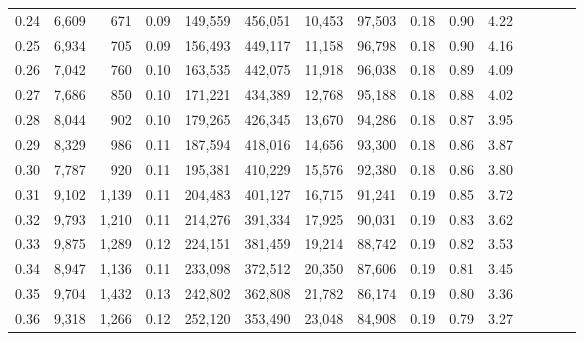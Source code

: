 \begin{tabular}{rrrcrrrrrrrrrrr}
0.24 &   6,609 &    671 &                                       0.09 &  149,559 &  456,051 &   10,453 &   97,503 &  0.18 &  0.90 &                         4.22 \\
0.25 &   6,934 &    705 &                                       0.09 &  156,493 &  449,117 &   11,158 &   96,798 &  0.18 &  0.90 &                         4.16 \\
0.26 &   7,042 &    760 &                                       0.10 &  163,535 &  442,075 &   11,918 &   96,038 &  0.18 &  0.89 &                         4.09 \\
0.27 &   7,686 &    850 &                                       0.10 &  171,221 &  434,389 &   12,768 &   95,188 &  0.18 &  0.88 &                         4.02 \\
0.28 &   8,044 &    902 &                                       0.10 &  179,265 &  426,345 &   13,670 &   94,286 &  0.18 &  0.87 &                         3.95 \\
0.29 &   8,329 &    986 &                                       0.11 &  187,594 &  418,016 &   14,656 &   93,300 &  0.18 &  0.86 &                         3.87 \\
0.30 &   7,787 &    920 &                                       0.11 &  195,381 &  410,229 &   15,576 &   92,380 &  0.18 &  0.86 &                         3.80 \\
0.31 &   9,102 &  1,139 &                                       0.11 &  204,483 &  401,127 &   16,715 &   91,241 &  0.19 &  0.85 &                         3.72 \\
0.32 &   9,793 &  1,210 &                                       0.11 &  214,276 &  391,334 &   17,925 &   90,031 &  0.19 &  0.83 &                         3.62 \\
0.33 &   9,875 &  1,289 &                                       0.12 &  224,151 &  381,459 &   19,214 &   88,742 &  0.19 &  0.82 &                         3.53 \\
0.34 &   8,947 &  1,136 &                                       0.11 &  233,098 &  372,512 &   20,350 &   87,606 &  0.19 &  0.81 &                         3.45 \\
0.35 &   9,704 &  1,432 &                                       0.13 &  242,802 &  362,808 &   21,782 &   86,174 &  0.19 &  0.80 &                         3.36 \\
0.36 &   9,318 &  1,266 &                                       0.12 &  252,120 &  353,490 &   23,048 &   84,908 &  0.19 &  0.79 &                         3.27 \\

\end{tabular}
